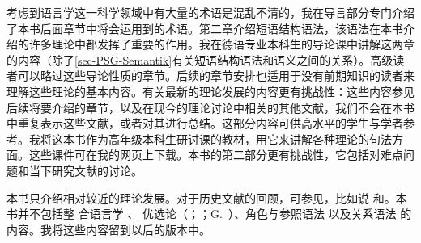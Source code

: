 考虑到语言学这一科学领域中有大量的术语是混乱不清的，我在导言部分专门介绍了本书后面章节中将会运用到的术语。第二章介绍短语结构语法，该语法在本书介绍的许多理论中都发挥了重要的作用。我在德语专业本科生的导论课中讲解这两章的内容（除了\ref{sec-PSG-Semantik}有关短语结构语法和语义之间的关系）。高级读者可以略过这些导论性质的章节。后续的章节安排也适用于没有前期知识的读者来理解这些理论的基本内容。有关最新的理论发展的内容更有挑战性：这些内容参见后续将要介绍的章节，以及在现今的理论讨论中相关的其他文献，我们不会在本书中重复表示这些文献，或者对其进行总结。这部分内容可供高水平的学生与学者参考。我将这本书作为高年级本科生研讨课的教材，用它来讲解各种理论的句法方面。这些课件可在我的网页上下载。本书的第二部分更有挑战性，它包括对难点问题和当下研究文献的讨论。

本书只介绍相对较近的理论发展。对于历史文献的回顾，可参见，比如说 \citet{Robins97a-u}和\citet{JL2006a-u}。本书并不包括整
合语言学 \citep{Lieb83a-u,Eisenberg2004a,Nolda2007a-u}、
优选论\indexot（\citealp{PS93a-u}；\citealp{Grimshaw97a-u}；G.\ \citealp{GMueller2000a-u}）、角色与参照语法 \citep{vanValin93a-ed}以及关系语法
 \citep{Perlmutter83a-ed,Perlmutter84b-ed}的内容。我将这些内容留到以后的版本中。


